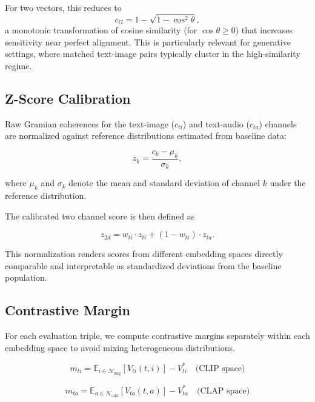 \documentclass[a4paper,fleqn]{cas-sc}
\begin{document}
\begin{itemize}
For two vectors, this reduces to
\begin{equation}
c_G = 1 - \sqrt{1 - \cos^2\theta},
\end{equation}
a monotonic transformation of cosine similarity (for $\cos\theta \geq 0$) that increases sensitivity near perfect alignment. This is particularly relevant for generative settings, where matched text-image pairs typically cluster in the high-similarity regime.


\subsection{Z-Score Calibration}

Raw Gramian coherences for the text-image ($c_{ti}$) and text-audio ($c_{ta}$) channels are normalized against reference distributions estimated from baseline data:

\begin{equation}
z_k = \frac{c_k - \mu_k}{\sigma_k},
\end{equation}

where $\mu_k$ and $\sigma_k$ denote the mean and standard deviation of channel $k$ under the reference distribution.

The calibrated two channel score is then defined as

\begin{equation}
z_{2d} = w_{ti} \cdot z_{ti} + (1 - w_{ti}) \cdot z_{ta}.
\end{equation}

This normalization renders scores from different embedding spaces directly comparable and interpretable as standardized deviations from the baseline population.


\subsection{Contrastive Margin}

For each evaluation triple, we compute contrastive margins separately within each embedding space to avoid mixing heterogeneous distributions.

\begin{equation}
m_{ti} =
\mathbb{E}_{i \in \mathcal{N}_{\text{img}}}
\left[
V_{ti}(t,i)
\right]
-
V_{ti}^{*}
\quad
\text{(CLIP space)}
\end{equation}

\begin{equation}
m_{ta} =
\mathbb{E}_{a \in \mathcal{N}_{\text{aud}}}
\left[
V_{ta}(t,a)
\right]
-
V_{ta}^{*}
\quad
\text{(CLAP space)}
\end{equation}


\end{itemize}
\end{document}
